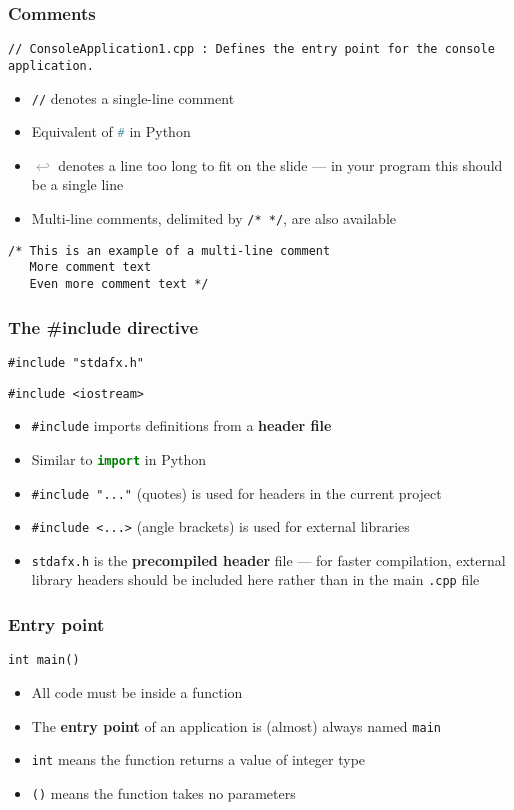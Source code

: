 \begin{frame}[fragile]
	\frametitle{Comments}
	\begin{lstlisting}
// ConsoleApplication1.cpp : Defines the entry point for the console application.
	\end{lstlisting}
	\begin{itemize}
		\item \lstinline{//} denotes a single-line comment
		\item Equivalent of \lstinline[language=Python]{#} in Python
		\item \textcolor{Gray}{$\hookleftarrow$} denotes a line too long to fit on the slide ---
			in your program this should be a single line
		\item Multi-line comments, delimited by \lstinline{/* */}, are also available
	\end{itemize}
	\begin{lstlisting}
/* This is an example of a multi-line comment
   More comment text
   Even more comment text */
	\end{lstlisting}
\end{frame}

\begin{frame}[fragile]
	\frametitle{The \#include directive}
	\begin{lstlisting}
#include "stdafx.h"
	\end{lstlisting}
	\begin{lstlisting}
#include <iostream>
	\end{lstlisting}
	\begin{itemize}
		\item \lstinline{#include} imports definitions from a \textbf{header file}
		\item Similar to \lstinline[language=Python]{import} in Python
		\item \lstinline{#include "..."} (quotes) is used for headers in the current project
		\item \lstinline{#include <...>} (angle brackets) is used for external libraries
		\item \texttt{stdafx.h} is the \textbf{precompiled header} file --- for faster compilation, external library headers should be included here rather than in the main \texttt{.cpp} file
	\end{itemize}
\end{frame}

\begin{frame}[fragile]
	\frametitle{Entry point}
	\begin{lstlisting}
int main()
	\end{lstlisting}
	\begin{itemize}
		\item All code must be inside a function
		\item The \textbf{entry point} of an application is (almost) always named \lstinline{main}
		\item \lstinline{int} means the function returns a value of integer type
		\item \lstinline{()} means the function takes no parameters
	\end{itemize}
\end{frame}

